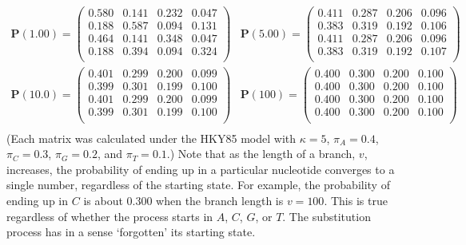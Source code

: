 \documentclass{svmult}
\begin{document}
$$
\begin{array}{cc}
{{\mathbf P}(1.00) = \left( \begin{array}{rrrr}
0.580 & 0.141 & 0.232 & 0.047 \\
0.188 & 0.587 & 0.094 & 0.131 \\
0.464 & 0.141 & 0.348 & 0.047 \\
0.188 & 0.394 & 0.094 & 0.324 \\
\end{array} \right)}
 &
{{\mathbf P}(5.00) = \left( \begin{array}{rrrr}
0.411 & 0.287 & 0.206 & 0.096 \\
0.383 & 0.319 & 0.192 & 0.106 \\
0.411 & 0.287 & 0.206 & 0.096 \\
0.383 & 0.319 & 0.192 & 0.107 \\
\end{array} \right)}
\end{array}
$$
$$
\begin{array}{cc}
{{\mathbf P}(10.0) = \left( \begin{array}{rrrr}
0.401 & 0.299 & 0.200 & 0.099 \\
0.399 & 0.301 & 0.199 & 0.100 \\
0.401 & 0.299 & 0.200 & 0.099 \\
0.399 & 0.301 & 0.199 & 0.100 \\
\end{array} \right)}
 &
{{\mathbf P}(100) = \left( \begin{array}{rrrr}
0.400 & 0.300 & 0.200 & 0.100 \\
0.400 & 0.300 & 0.200 & 0.100 \\
0.400 & 0.300 & 0.200 & 0.100 \\
0.400 & 0.300 & 0.200 & 0.100 \\
\end{array} \right)}
\\
\end{array}
$$
(Each matrix was calculated under the HKY85 model with 
$\kappa = 5$, $\pi_A = 0.4$, $\pi_C = 0.3$, $\pi_G = 0.2$, and $\pi_T = 0.1$.)
Note that as the length of a branch, $v$, increases, the probability of ending up in a particular nucleotide converges
to a single number, regardless of the starting state. For example, the probability of ending up in $C$ is about 0.300
when the branch length is $v=100$. This is true regardless of whether the process starts in $A$, $C$, $G$, or $T$.
The substitution process has in a sense `forgotten' its starting state.
\end{document}
